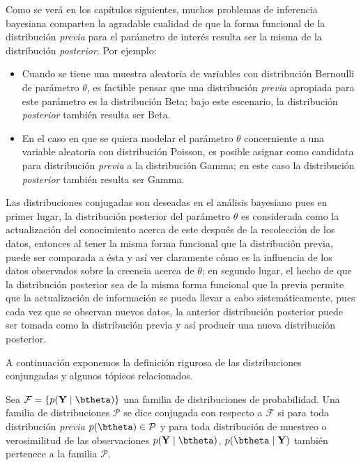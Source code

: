 \documentclass[10pt,openright]{book}\usepackage[]{graphicx}\usepackage[]{color}
\begin{document}
Como se verá en los capítulos siguientes, muchos problemas de inferencia bayesiana comparten la agradable cualidad de que la forma funcional de la distribución \emph{previa} para el parámetro de interés resulta ser la misma de la distribución \emph{posterior}. Por ejemplo:

\begin{itemize}
  \item Cuando se tiene una muestra aleatoria de variables con distribución Bernoulli de parámetro $\theta$, es factible pensar que una distribución \emph{previa} apropiada para este parámetro es la distribución Beta; bajo este escenario, la distribución \emph{posterior} también resulta ser Beta.
  \item En el caso en que se quiera modelar el parámetro $\theta$ concerniente a una variable aleatoria con distribución Poisson, es posible asignar como candidata para distribución \emph{previa} a la distribución Gamma; en este caso la distribución \emph{posterior} también resulta ser Gamma.
\end{itemize}

Las distribuciones conjugadas son deseadas en el análisis bayesiano pues en primer lugar, la distribución posterior del parámetro $\theta$ es considerada como la actualización del conocimiento acerca de este después de la recolección de los datos, entonces al tener la misma forma funcional que la distribución previa, puede ser comparada a ésta y así ver claramente cómo es la influencia de los datos observados sobre la creencia acerca de $\theta$; en segundo lugar, el hecho de que la distribución posterior sea de la misma forma funcional que la previa permite que la actualización de información se pueda llevar a cabo sistemáticamente, pues cada vez que se observan nuevos datos, la anterior distribución posterior puede ser tomada como la distribución previa y así producir una nueva distribución posterior. 

A continuación exponemos la definición rigurosa de las distribuciones conjungadas y algunos tópicos relacionados.

\begin{Defi}
Sea $\mathcal{F}=\{p(\mathbf{Y} \mid \btheta)\}$ una familia de distribuciones de probabilidad. Una familia de distribuciones $\mathcal{P}$ se dice conjugada con respecto a $\mathcal{F}$ si para toda distribución \emph{previa} $p(\btheta) \in \mathcal{P}$ y para toda distribución de muestreo o verosimilitud de las observaciones $p(\mathbf{Y} \mid \btheta)$, $p(\btheta \mid \mathbf{Y})$ también pertenece a la familia $\mathcal{P}$.
\end{Defi}
\end{document}
